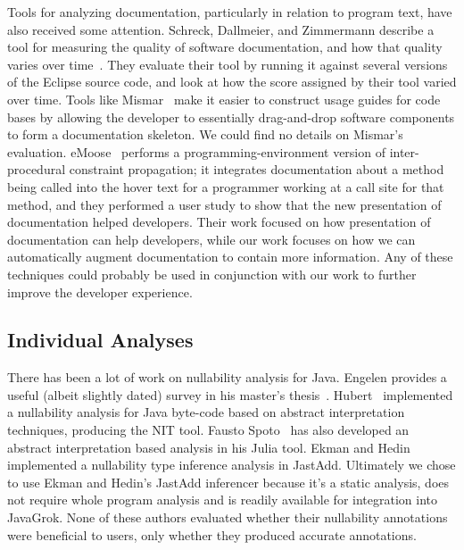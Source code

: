 Tools for analyzing documentation, particularly in relation to program text,
have also received some attention.  Schreck, Dallmeier, and Zimmermann describe
a tool for measuring the quality of software documentation, and how that
quality varies over time~\cite{evolvedoc}. They evaluate their tool by running
it against several versions of the Eclipse source code, and look at how the
score assigned by their tool varied over time.  Tools like Mismar~\cite{mismar} make
it easier to construct usage guides for code bases by allowing the developer to
essentially drag-and-drop software components to form a documentation skeleton.
We could find no details on Mismar's evaluation.
eMoose~\cite{emoose} performs a programming-environment version of
inter-procedural constraint propagation; it integrates
documentation about a method being called into the hover text for a programmer
working at a call site for that method, and they performed a user study to show
that the new presentation of documentation helped developers.  Their work
focused on how presentation of documentation can help developers, while our work
focuses on how we can automatically augment documentation to contain more
information.  Any of these
techniques could probably be used
in conjunction with our work to further improve the developer experience.

\subsection{Individual Analyses}

There has been a lot of work on nullability analysis for Java.
Engelen provides a useful (albeit slightly dated) survey in his master's thesis~\cite{Engelen2006}.
Hubert~\cite{NIT} implemented a nullability
analysis for Java byte-code based on abstract interpretation
techniques, producing the {\sc NIT} tool.  Fausto Spoto~\cite{Spoto2008} has also developed
an abstract interpretation based analysis in his Julia tool.
Ekman and Hedin~\cite{NonNullTypeInference} implemented a nullability type
inference analysis in JastAdd.  Ultimately we chose to use 
Ekman and Hedin's JastAdd inferencer because it's a static analysis, does not require whole program analysis and is readily available for
integration into JavaGrok.  None of these authors evaluated whether their
nullability annotations were beneficial to users, only whether they produced
accurate annotations.


